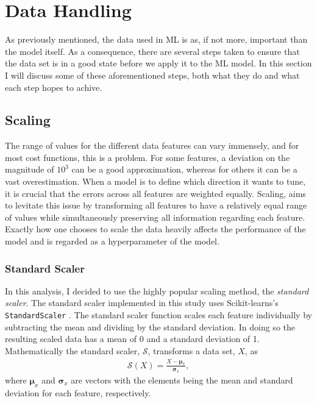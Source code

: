 \section{Data Handling}\label{subsec:Scaling}
As previously mentioned, the data used in \ac{ML} is as, if not more, important than the model itself. 
As a consequence, there are several steps taken to ensure that the data set is in a good state before 
we apply it to the \ac{ML} model. In this section I will discuss some of these aforementioned steps, both 
what they do and what each step hopes to achive.
\subsection{Scaling}
The range of values for the different data features can vary immensely, and for most 
cost functions, this is a problem. For some features, a deviation on the magnitude 
of $10^3$ can be a good approximation, whereas for others it can be a vast 
overestimation. When a model is to define which direction it wants to tune, it is 
crucial that the errors across all features are weighted equally. Scaling, aims to levitate 
this issue by transforming all features to have a relatively equal range of values while
simultaneously preserving all information regarding each feature. Exactly how one chooses 
to scale the data heavily affects the performance of the model and is regarded as a hyperparameter 
of the model. 
\subsubsection{Standard Scaler}\label{subsubsec:StandardScalar}
In this analysis, I decided to use the highly popular scaling method, the \emph{standard scaler}. 
The standard scaler implemented in this study uses Scikit-learns's \texttt{StandardScaler}
\cite{StandardScaler}. The standard scaler function scales each feature individually by subtracting 
the mean and dividing by the standard deviation. In doing so the resulting scaled data has a mean 
of 0 and a standard deviation of 1. Mathematically the standard scaler, $\mathcal{S}$, transforms 
a data set, $X$, as 
\begin{align}
    \mathcal{S} \left(X\right) = \frac{X - \boldsymbol{\mu} _x}{\boldsymbol{\sigma}_x} ,
\end{align}
where $\boldsymbol{\mu} _x$ and $\boldsymbol{\sigma}_x$ are vectors with the elements being 
the mean and standard deviation for each feature, respectively.
